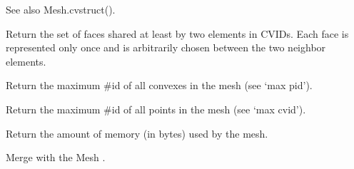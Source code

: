\documentclass[a4paper,11pt,english]{sphinxmanual}
\begin{document}
\begin{fulllineitems}
\begin{fulllineitems}
See also Mesh.cvstruct().

\end{fulllineitems}


\begin{fulllineitems}
\label{\detokenize{python/cmdref_Mesh:getfem.Mesh.inner_faces}}
Return the set of faces shared at least by two elements in CVIDs.
Each face is represented only once and is arbitrarily chosen
between the two neighbor elements.

\end{fulllineitems}


\begin{fulllineitems}
\label{\detokenize{python/cmdref_Mesh:getfem.Mesh.max_cvid}}
Return the maximum \#id of all convexes in the mesh (see ‘max pid’).

\end{fulllineitems}


\begin{fulllineitems}
\label{\detokenize{python/cmdref_Mesh:getfem.Mesh.max_pid}}
Return the maximum \#id of all points in the mesh (see ‘max cvid’).

\end{fulllineitems}


\begin{fulllineitems}
\label{\detokenize{python/cmdref_Mesh:getfem.Mesh.memsize}}
Return the amount of memory (in bytes) used by the mesh.

\end{fulllineitems}


\begin{fulllineitems}
\label{\detokenize{python/cmdref_Mesh:getfem.Mesh.merge}}
Merge with the Mesh .


\end{fulllineitems}
\end{fulllineitems}
\end{document}
